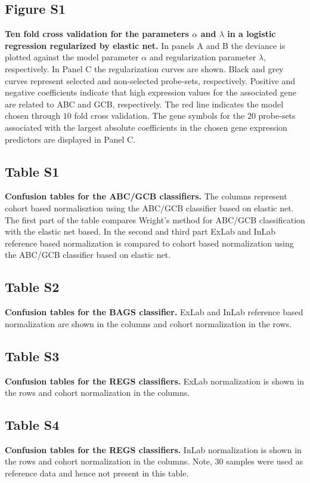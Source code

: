 \documentclass[10pt,letterpaper]{article}
\begin{document}
\subsection*{Figure S1}
\label{fig:crossval}
\textbf{Ten fold cross validation for the parameters $\alpha$ and $\lambda$ in a logistic regression regularized by elastic net.}
In panels A and B the deviance is plotted against the model parameter $\alpha$ and regularization parameter $\lambda$, respectively.
In Panel C the regularization curves are shown.
Black and grey curves represent selected and non-selected probe-sets, respectively.
Positive and negative coefficients indicate that high expression values for the associated gene are related to ABC and GCB, respectively.
The red line indicates the model chosen through $10$ fold cross validation.
The gene symbols for the $20$ probe-sets associated with the largest absolute coefficients in the chosen gene expression predictors are displayed in Panel C.



\subsection*{Table S1}\label{tab:confusionABCGCBHEMA}
\textbf{Confusion tables for the ABC/GCB classifiers.}
The columns represent cohort based normalisztion using the ABC/GCB classifier
based on elastic net.
The first part of the table compares Wright's method for ABC/GCB classification
with the elastic net based.
In the second and third part ExLab and InLab reference based normalization is
compared to cohort based normalization using the ABC/GCB classifier based on
elastic net.

\subsection*{Table S2}\label{tab:BAGShemaclass}
\textbf{Confusion tables for the BAGS classifier.} ExLab and InLab reference
based normalization are shown in the columns and cohort normalization in the
rows.

\subsection*{Table S3}\label{tab:confusiondrugonebyone}
\textbf{Confusion tables for the REGS classifiers.}
ExLab normalization is shown in the rows and cohort normalization in the
columns.

\subsection*{Table S4}\label{tab:confusiondrugreference}
\textbf{Confusion tables for the REGS classifiers.}
InLab normalization is shown in the rows and cohort normalization in
the columns. Note, 30 samples were used as reference data and hence not present
in this table.
\end{document}
